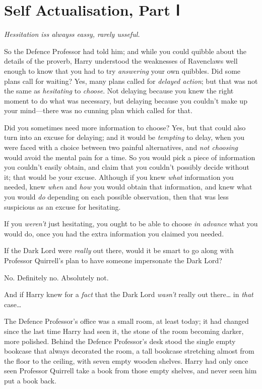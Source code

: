 \chapter{Self Actualisation, Part Ⅰ}\label{self-actualisation-part}

\emph{Hessitation iss alwayss eassy, rarely usseful.}

So the Defence Professor had told him; and while you could quibble about
the details of the proverb, Harry understood the weaknesses of
Ravenclaws well enough to know that you had to try \emph{answering} your
own quibbles. Did some plans call for waiting? Yes, many plans called
for \emph{delayed action}; but that was not the same as
\emph{hesitating} to \emph{choose}. Not delaying because you knew the
right moment to do what was necessary, but delaying because you couldn't
make up your mind---there was no cunning plan which called for that.

Did you sometimes need more information to choose? Yes, but that could
also turn into an excuse for delaying; and it would be \emph{tempting}
to delay, when you were faced with a choice between two painful
alternatives, and \emph{not choosing} would avoid the mental pain for a
time. So you would pick a piece of information you couldn't easily
obtain, and claim that you couldn't possibly decide without it; that
would be your excuse. Although if you knew \emph{what} information you
needed, knew \emph{when} and \emph{how} you would obtain that
information, and knew what you would \emph{do} depending on each
possible observation, then that was less suspicious as an excuse for
hesitating.

If you \emph{weren't} just hesitating, you ought to be able to choose
\emph{in advance} what you would do, once you had the extra information
you claimed you needed.

If the Dark Lord were \emph{really} out there, would it be smart to go
along with Professor Quirrell's plan to have someone impersonate the
Dark Lord?

No. Definitely no. Absolutely not.

And if Harry knew for a \emph{fact} that the Dark Lord \emph{wasn't}
really out there\ldots{} in \emph{that} case\ldots{}

The Defence Professor's office was a small room, at least today; it had
changed since the last time Harry had seen it, the stone of the room
becoming darker, more polished. Behind the Defence Professor's desk
stood the single empty bookcase that always decorated the room, a tall
bookcase stretching almost from the floor to the ceiling, with seven
empty wooden shelves. Harry had only once seen Professor Quirrell take a
book from those empty shelves, and never seen him put a book back.

